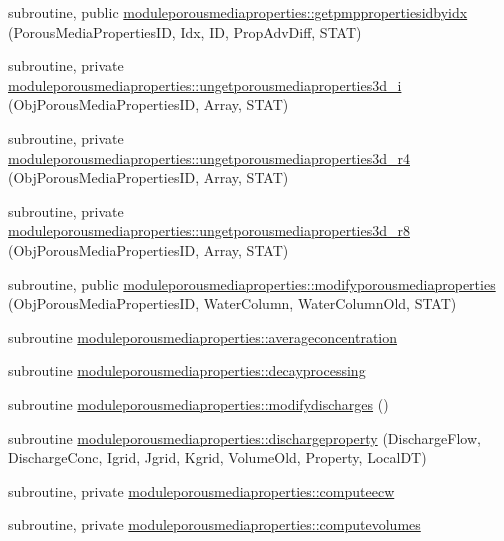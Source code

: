 \begin{DoxyCompactItemize}
\item 
subroutine, public \mbox{\hyperlink{namespacemoduleporousmediaproperties_af2bce43f88ee94ebe28c4b5f01c9f098}{moduleporousmediaproperties\+::getpmppropertiesidbyidx}} (Porous\+Media\+Properties\+ID, Idx, ID, Prop\+Adv\+Diff, S\+T\+AT)
\item 
subroutine, private \mbox{\hyperlink{namespacemoduleporousmediaproperties_a08471307dc61da0cc694bc4e7b47b840}{moduleporousmediaproperties\+::ungetporousmediaproperties3d\+\_\+i}} (Obj\+Porous\+Media\+Properties\+ID, Array, S\+T\+AT)
\item 
subroutine, private \mbox{\hyperlink{namespacemoduleporousmediaproperties_ae5667c60b268b4c99e403dc08b831ee5}{moduleporousmediaproperties\+::ungetporousmediaproperties3d\+\_\+r4}} (Obj\+Porous\+Media\+Properties\+ID, Array, S\+T\+AT)
\item 
subroutine, private \mbox{\hyperlink{namespacemoduleporousmediaproperties_adae76989107c8fbe8fc908a111ea82ad}{moduleporousmediaproperties\+::ungetporousmediaproperties3d\+\_\+r8}} (Obj\+Porous\+Media\+Properties\+ID, Array, S\+T\+AT)
\item 
subroutine, public \mbox{\hyperlink{namespacemoduleporousmediaproperties_af5a9da28db32e6f4ed9c06f73a7dc775}{moduleporousmediaproperties\+::modifyporousmediaproperties}} (Obj\+Porous\+Media\+Properties\+ID, Water\+Column, Water\+Column\+Old, S\+T\+AT)
\item 
subroutine \mbox{\hyperlink{namespacemoduleporousmediaproperties_aa717037551efabb3abaec9e2f610d0f3}{moduleporousmediaproperties\+::averageconcentration}}
\item 
subroutine \mbox{\hyperlink{namespacemoduleporousmediaproperties_a9e33074d02a745b0e8cd90eccef5b5ed}{moduleporousmediaproperties\+::decayprocessing}}
\item 
subroutine \mbox{\hyperlink{namespacemoduleporousmediaproperties_a4b551b0430b61a97ca5a026b6467c003}{moduleporousmediaproperties\+::modifydischarges}} ()
\item 
subroutine \mbox{\hyperlink{namespacemoduleporousmediaproperties_a0e66cb3f0270a54dfa87774f558ac3d5}{moduleporousmediaproperties\+::dischargeproperty}} (Discharge\+Flow, Discharge\+Conc, Igrid, Jgrid, Kgrid, Volume\+Old, Property, Local\+DT)
\item 
subroutine, private \mbox{\hyperlink{namespacemoduleporousmediaproperties_a32b1336499ea5a5ca4e733054acee536}{moduleporousmediaproperties\+::computeecw}}
\item 
subroutine, private \mbox{\hyperlink{namespacemoduleporousmediaproperties_a8fba489b1d7b502e23196a791d678e03}{moduleporousmediaproperties\+::computevolumes}}

\end{DoxyCompactItemize}
